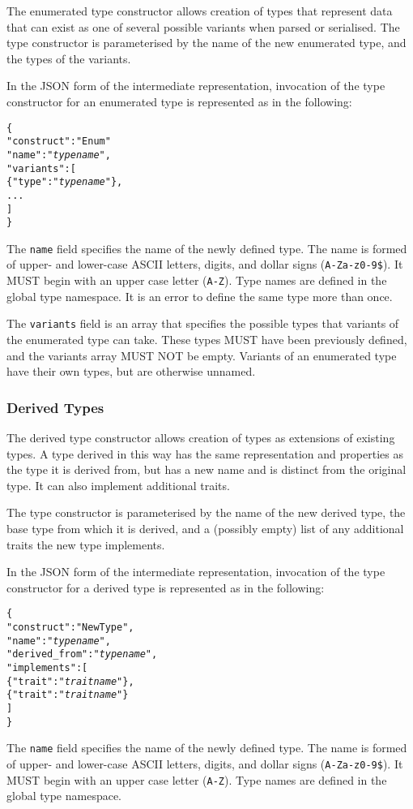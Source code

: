 \documentclass[10pt,twocolumn,a4paper]{article}
\newcommand{\code}[1]{\texttt{#1}}
\begin{document}
The enumerated type constructor allows creation of types that represent
data that can exist as one of several possible variants when parsed or
serialised. The type constructor is parameterised by the name of the new
enumerated type, and the types of the variants.

In the JSON form of the intermediate representation, invocation of the type
constructor for an enumerated type is represented as in the following:
\footnotesize
\begin{alltt}
  \{
    "construct"   : "Enum"
    "name"        : "\emph{type name}",
    "variants"    : [
      \{"type" : "\emph{type name}"\},
      ...
    ]
  \}
\end{alltt}
\normalsize
The \code{name} field specifies the name of the newly defined type. The
name is formed of upper- and lower-case ASCII letters, digits, and dollar
signs (\code{A-Za-z0-9\$}).  It MUST begin with an upper case letter
(\code{A-Z}). Type names are defined in the global type namespace.
It is an error to define the same type more than once.

The \code{variants} field is an array that specifies the possible types
that variants of the enumerated type can take. These types MUST have been
previously defined, and the variants array MUST NOT be empty. Variants of
an enumerated type have their own types, but are otherwise unnamed.

\subsubsection{Derived Types}

The derived type constructor allows creation of types as extensions of
existing types. A type derived in this way has the same representation
and properties as the type it is derived from, but has a new name and is
distinct from the original type. It can also implement additional traits.

The type constructor is parameterised by the name of the new derived type,
the base type from which it is derived, and a (possibly empty) list of any
additional traits the new type implements.

In the JSON form of the intermediate representation, invocation of the
type constructor for a derived type is represented as in the following:
\footnotesize
\begin{alltt}
  \{
    "construct"     : "NewType",
    "name"          : "\emph{type name}",
    "derived\_from"  : "\emph{type name}",
    "implements"    : [
      \{"trait" : "\emph{trait name}"\},
      \{"trait" : "\emph{trait name}"\}
    ]
  \}
\end{alltt}
\normalsize
The \code{name} field specifies the name of the newly defined type. The
name is formed of upper- and lower-case ASCII letters, digits, and dollar
signs (\code{A-Za-z0-9\$}).  It MUST begin with an upper case letter
(\code{A-Z}). Type names are defined in the global type namespace.
\end{document}
